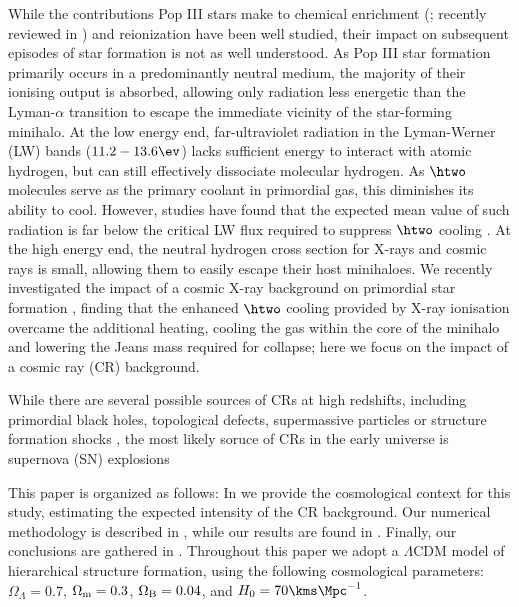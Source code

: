 While the contributions Pop III stars make to chemical enrichment (\citealt{MadauFerraraRees2001,MoriFerraraMadau2002,BrommYoshidaHernquist2003,Hegeretal2003,UmedaNomoto2003,TornatoreFerraraSchneider2007,Greifetal2007,Greifetal2010,WiseAbel2008,Maioetal2011}; recently reviewed in \citealt{KarlssonBrommHawthorn2013}) and reionization \citep{Kitayamaetal2004,Sokasianetal2004,WhalenAbelNorman2004,AlvarezBrommShapiro2006,JohnsonGreifBromm2007,Robertsonetal2010} have been well studied, their impact on subsequent episodes of star formation is not as well understood.  As Pop III star formation primarily occurs in a predominantly neutral medium, the majority of their ionising output is absorbed, allowing only radiation less energetic than the Lyman-$\alpha$ transition to escape the immediate vicinity of the star-forming minihalo.  At the low energy end, far-ultraviolet radiation in the Lyman-Werner (LW) bands ($11.2 - 13.6\ev$) lacks sufficient energy to interact with atomic hydrogen, but can still effectively dissociate molecular hydrogen.  As $\htwo$ molecules serve as the primary coolant in primordial gas, this diminishes its ability to cool.  However, studies have found that the expected mean value of such radiation is far below the critical LW flux required to suppress $\htwo$ cooling \citep{Dijkstraetal2008}. At the high energy end, the neutral hydrogen cross section for X-rays and cosmic rays is small, allowing them to easily escape their host minihaloes.  We recently investigated the impact of a cosmic X-ray background on primordial star formation \citep{Hummeletal2014}, finding that the enhanced $\htwo$ cooling provided by X-ray ionisation overcame the additional heating, cooling the gas within the core of the minihalo and lowering the Jeans mass required for collapse; here we focus on the impact of a cosmic ray (CR) background.  

While there are several possible sources of CRs at high redshifts, including primordial black holes, topological defects, supermassive particles or structure formation shocks \citep{BiermannSigl2001,Stanev2004,Pfrommeretal2006}, the most likely soruce of CRs in the early universe is supernova (SN) explosions \citep[e.g.,][]{GinzburgSyrovatskii1969}

This paper is organized as follows: In  we provide the cosmological context for this study, estimating the expected intensity of the CR background. Our numerical methodology is described in , while our results are found in .  Finally, our conclusions are gathered in . Throughout this paper we adopt a $\Lambda$CDM model of hierarchical structure formation, using the following cosmological parameters: $\Omega_{\Lambda} = 0.7$, $\Omega_{\rm m} = 0.3$, $\Omega_{\rm B} = 0.04$, and $H_0 = 70 \kms \Mpc^{-1}$.